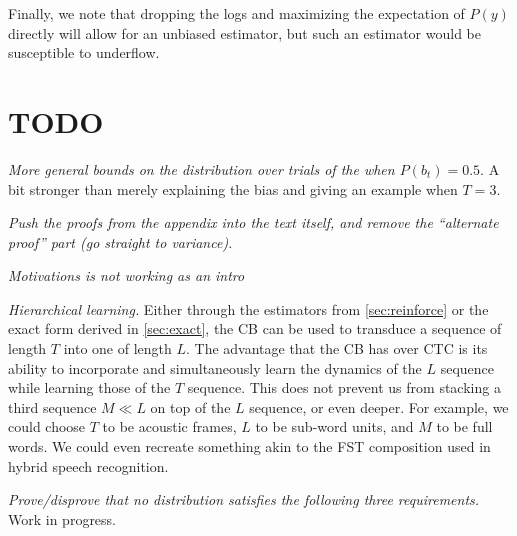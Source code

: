 \documentclass{article}
\begin{document}
Finally, we note that dropping the logs and maximizing the expectation of
$P(y)$ directly will allow for an unbiased estimator, but such an estimator
would be susceptible to underflow.

\section{TODO}


\emph{More general bounds on the distribution over trials of the
\citeauthor{luoLearningOnlineAlignments2017} when $P(b_t) = 0.5$}. A bit
stronger than merely explaining the bias and giving an example when $T = 3$.

\emph{Push the proofs from the appendix into the text itself, and remove
the ``alternate proof'' part (go straight to variance).}

\emph{Motivations is not working as an intro}

\emph{Hierarchical learning.} Either through the estimators from
\cref{sec:reinforce} or the exact form derived in \cref{sec:exact}, the CB can
be used to transduce a sequence of length $T$ into one of length $L$. The
advantage that the CB has over CTC is its ability to incorporate and
simultaneously learn the dynamics of the $L$ sequence while learning those of
the $T$ sequence. This does not prevent us from stacking a third sequence
$M \ll L$ on top of the $L$ sequence, or even deeper. For example, we could
choose $T$ to be acoustic frames, $L$ to be sub-word units, and $M$ to be full
words. We could even recreate something akin to the FST composition used in
hybrid speech recognition.

\emph{Prove/disprove that no distribution satisfies the following three
requirements.}
Work in progress.
\end{document}

